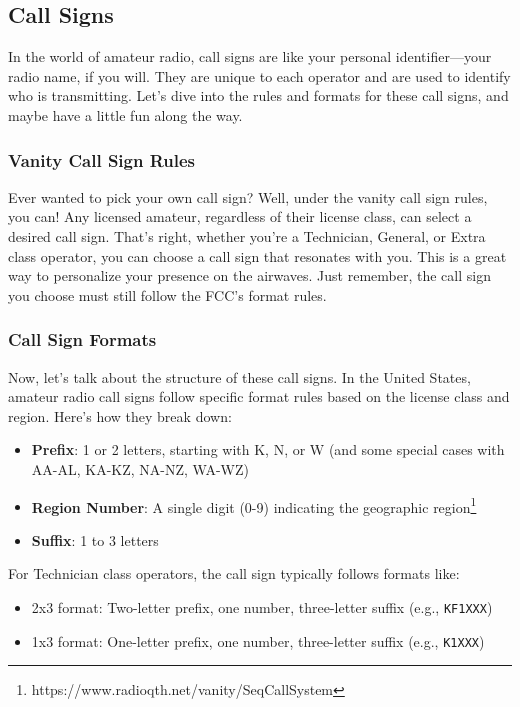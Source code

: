\subsection{Call Signs}
\label{subsec:call-signs}

In the world of amateur radio, call signs are like your personal identifier—your radio name, if you will. They are unique to each operator and are used to identify who is transmitting. Let’s dive into the rules and formats for these call signs, and maybe have a little fun along the way.

\subsubsection*{Vanity Call Sign Rules}
Ever wanted to pick your own call sign? Well, under the vanity call sign rules, you can! Any licensed amateur, regardless of their license class, can select a desired call sign. That’s right, whether you’re a Technician, General, or Extra class operator, you can choose a call sign that resonates with you. This is a great way to personalize your presence on the airwaves. Just remember, the call sign you choose must still follow the FCC’s format rules.

\subsubsection*{Call Sign Formats}
Now, let's talk about the structure of these call signs. In the United States, amateur radio call signs follow specific format rules based on the license class and region. Here's how they break down:

\begin{itemize}[noitemsep]    \item \textbf{Prefix}: 1 or 2 letters, starting with K, N, or W (and some special cases with AA-AL, KA-KZ, NA-NZ, WA-WZ)
    \item \textbf{Region Number}: A single digit (0-9) indicating the geographic region\footnote{https://www.radioqth.net/vanity/SeqCallSystem}
    \item \textbf{Suffix}: 1 to 3 letters
\end{itemize}

For Technician class operators, the call sign typically follows formats like:
\begin{itemize}[noitemsep]    \item 2x3 format: Two-letter prefix, one number, three-letter suffix (e.g., \texttt{KF1XXX})
    \item 1x3 format: One-letter prefix, one number, three-letter suffix (e.g., \texttt{K1XXX})
\end{itemize}

